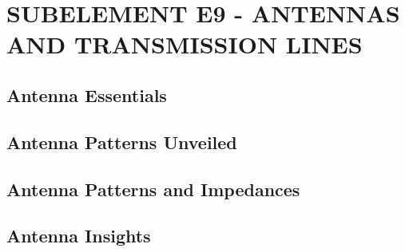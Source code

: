 \documentclass[12pt]{book}
\begin{document}
\chapter{SUBELEMENT E9 - ANTENNAS AND TRANSMISSION LINES}
\section{Antenna Essentials}












\section{Antenna Patterns Unveiled}











\section{Antenna Patterns and Impedances}














\section{Antenna Insights}












\end{document}
